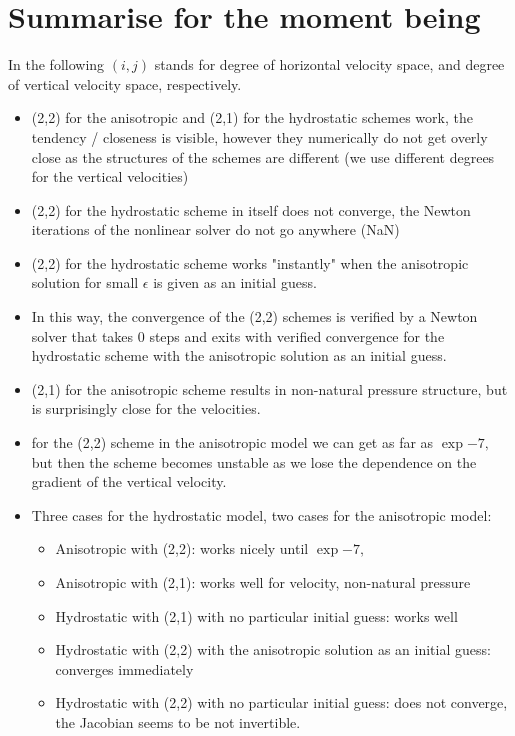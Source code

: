 \documentclass[11pt]{article}
\begin{document}
\section{Summarise for the moment being}

In the following $(i,j)$ stands for degree of horizontal velocity space, and degree of vertical velocity space, respectively.

\begin{itemize}
  \item (2,2) for the anisotropic and (2,1) for the hydrostatic schemes work, the tendency / closeness is visible, however they numerically do not get overly close as the structures of the schemes are different (we use different degrees for the vertical velocities)
  \item (2,2) for the hydrostatic scheme in itself does not converge, the Newton iterations of the nonlinear solver do not go anywhere (NaN)
  \item (2,2) for the hydrostatic scheme works "instantly" when the anisotropic solution for small $\epsilon$ is given as an initial guess.
  \item In this way, the convergence of the (2,2) schemes is verified by a Newton solver that takes 0 steps and exits with verified convergence for the hydrostatic scheme with the anisotropic solution as an initial guess.
  \item (2,1) for the anisotropic scheme results in non-natural pressure structure, but is surprisingly close for the velocities.
  \item for the (2,2) scheme in the anisotropic model we can get as far as $\exp{-7},$ but then the scheme becomes unstable as we lose the dependence on the gradient of the vertical velocity.
  \item Three cases for the hydrostatic model, two cases for the anisotropic model:
  \begin{itemize}
    \item Anisotropic with (2,2): works nicely until $\exp{-7},$
    \item Anisotropic with (2,1): works well for velocity, non-natural pressure
    \item Hydrostatic with (2,1) with no particular initial guess: works well
    \item Hydrostatic with (2,2) with the anisotropic solution as an initial guess: converges immediately
    \item Hydrostatic with (2,2) with no particular initial guess: does not converge, the Jacobian seems to be not invertible.
  \end{itemize}
\end{itemize}
\end{document}
